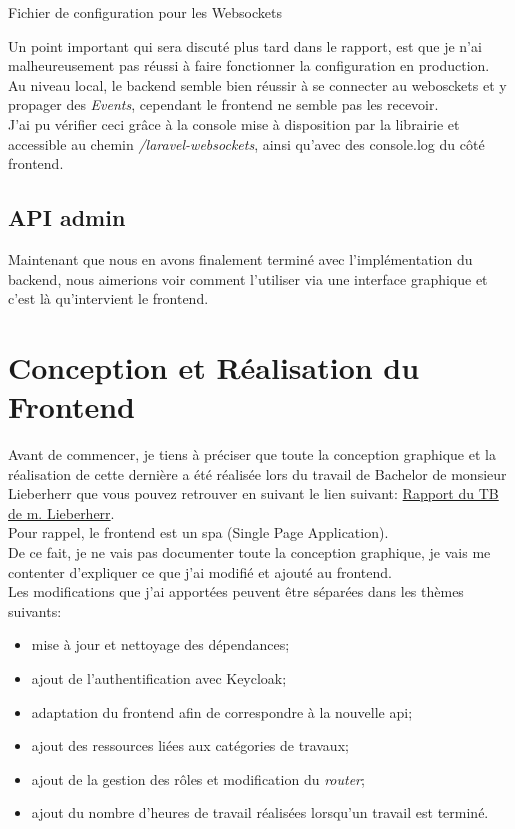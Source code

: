 \documentclass[
    iai, %
    il, %
]{heig-tb}
\begin{document}
\begin{listing}[h]
    \inputminted{php}{assets/code/websockets.php}
    \caption{Fichier de configuration pour les Websockets \label{ws-websockets}}
\end{listing}

Un point important qui sera discuté plus tard dans le rapport, est que je n'ai malheureusement pas réussi à faire fonctionner la configuration en production. \\
Au niveau local, le  \Gls{backend} semble bien réussir à se connecter au webosckets et y propager des \emph{Events}, cependant le \Gls{frontend} ne semble pas les recevoir. \\
J'ai pu vérifier ceci grâce à la console mise à disposition par la librairie et accessible au chemin \emph{/laravel-websockets}, ainsi qu'avec des console.log du côté \Gls{frontend}.


\section{API admin}

Maintenant que nous en avons finalement terminé avec l'implémentation du \Gls{backend}, nous aimerions voir comment l'utiliser via une interface graphique et c'est là qu'intervient le \Gls{frontend}.

\chapter{Conception et Réalisation du Frontend}
Avant de commencer, je tiens à préciser que toute la conception graphique et la réalisation de cette dernière a été réalisée lors du travail de Bachelor de monsieur Lieberherr que vous pouvez retrouver en suivant le lien suivant: \href{https://tb.heig-vd.ch/7532}{Rapport du TB de m. Lieberherr}. \\
Pour rappel, le \Gls{frontend} est un \Gls{spa} (Single Page Application). \\
De ce fait, je ne vais pas documenter toute la conception graphique, je vais me contenter d'expliquer ce que j'ai modifié et ajouté au \Gls{frontend}. \\
Les modifications que j'ai apportées peuvent être séparées dans les thèmes suivants:
\begin{itemize}
    \item mise à jour et nettoyage des dépendances;
    \item ajout de l'authentification avec Keycloak;
    \item adaptation du \Gls{frontend} afin de correspondre à la nouvelle \Gls{api};
    \item ajout des ressources liées aux catégories de travaux;
    \item ajout de la gestion des rôles et modification du \emph{router};
    \item ajout du nombre d'heures de travail réalisées lorsqu'un travail est terminé.
\end{itemize}
\end{document}
